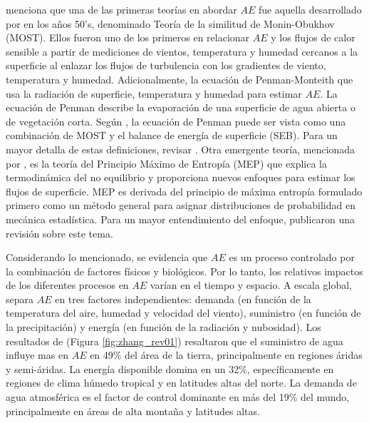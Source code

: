 \documentclass[12pt]{article}
\begin{document}

\thispagestyle{empty}

\citet{wang2012review} menciona que una de las primeras teorías en abordar $AE$ fue aquella desarrollado por \citet{monin1954basic} en los años 50's, denominado Teoría de la similitud de Monin-Obukhov (MOST). Ellos fueron uno de los primeros en relacionar $AE$ y los flujos de calor sensible a partir de mediciones de vientos, temperatura y humedad cercanos a la superficie al enlazar los flujos de turbulencia con los gradientes de viento, temperatura y humedad. Adicionalmente, la ecuación de Penman-Monteith \citep{penman1948natural,monteith1965evaporation} que usa la radiación de superficie, temperatura y humedad para estimar $AE$. La ecuación de Penman describe la evaporación de una superficie de agua abierta o de vegetación corta. Según \citet{wang2012review}, la ecuación de Penman puede ser vista como una combinación de MOST y el balance de energía de superficie (SEB). Para un mayor detalla de estas definiciones, revisar \citet{wang2012review}. Otra emergente teoría, mencionada por \citet{zhang2016review}, es la teoría del Principio Máximo de Entropía (MEP) que explica la termodinámica del no equilibrio y proporciona nuevos enfoques para estimar los flujos de superficie. MEP es derivada del principio de máxima entropía formulado primero como un método general para asignar distribuciones de probabilidad en mecánica estadística. Para un mayor entendimiento del enfoque, \citet{zhang2016review} publicaron una revisión sobre este tema.

Considerando lo mencionado, se evidencia que $AE$ es un proceso controlado por la combinación de factores físicos y biológicos. Por lo tanto, los relativos impactos de los diferentes procesos en $AE$ varían en el tiempo y espacio. A escala global, \citet{zhang2015vegetation} separa $AE$ en tres factores independientes: demanda (en función de la temperatura del aire, humedad y velocidad del viento), suministro (en función de la precipitación) y energía (en función de la radiación y nubosidad). Los resultados de \citet{zhang2015vegetation} (Figura \ref{fig:zhang_rev01}) resaltaron que el suministro de agua influye mas en $AE$ en 49\% del área de la tierra, principalmente en regiones áridas y semi-áridas. La energía disponible domina en un 32\%, específicamente en regiones de clima húmedo tropical y en latitudes altas del norte. La demanda de agua atmosférica es el factor de control dominante en más del 19\% del mundo, principalmente en áreas de alta montaña y latitudes altas. 
\end{document}
